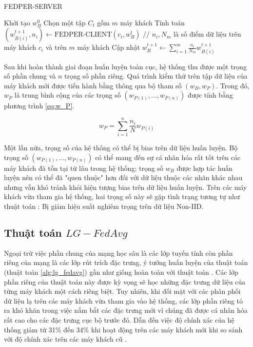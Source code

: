 \begin{algorithm}[H]
    \caption{FEDPER-SERVER \cite{arivazhagan2019federated}} \label{alg:fedper_server}
    \begin{algorithmic}[1]
        \State Khởi tạo $w_{B}^{0}$
            \State Chọn một tập $C_t$ gồm $m$ máy khách
                \State Tính toán $(w_{B(i)}^{t+1}, n_i) \gets \text{FEDPER-CLIENT}(c_i, w_B^t)$
            \EndFor
            \State // $n_i, N_m$ là số điểm dữ liệu trên máy khách $c_i$ và trên $m$ máy khách
            \State Cập nhật $w_B^{t+1} \gets \sum_{i=1}^m \frac{n_i}{N_m} w_{B(i)}^{t+1}$
        \EndFor
    \end{algorithmic}
\end{algorithm}

Sau khi hoàn thành giai đoạn huấn luyện toàn cục, hệ thống thu được một trọng số phần chung và $n$ trọng số phần riêng. Quá trình kiểm thử trên tập dữ liệu của máy khách mới được tiến hành bằng thông qua bộ tham số $(w_B, w_P)$. Trong đó, $w_P$ là trung bình cộng của các trọng số $(w_{P(1)},...,w_{P(n)})$ được tính bằng phương trình \ref{eq:w_P}.

\begin{dmath}
    \label{eq:w_P}
    w_P = \sum_{i=1}^n \frac{n_i}{N}w_{P(i)}
\end{dmath}

Một lần nữa, trọng số của hệ thống có thể bị bias trên dữ liệu huấn luyện. Bộ trọng số $(w_{P(1)},...,w_{P(n)})$ có thể mang đến sự cá nhân hóa rất tốt trên các máy khách đã tồn tại từ lâu trong hệ thống; trọng số $w_B$ được hợp tác huấn luyện nên có thể đã "quen thuộc" hơn đối với dữ liệu thuộc các nhãn khác nhau nhưng vẫn khó tránh khỏi hiện tượng bias trên dữ liệu huấn luyện. Trên các máy khách vừa tham gia hệ thống, hai trọng số này sẽ gặp tình trạng tương tự như thuật toán : Bị giảm hiệu suất nghiêm trọng trên dữ liệu Non-IID.

\subsection{Thuật toán $LG-FedAvg$}

Ngoại trừ việc phần chung của mạng học sâu là các lớp tuyến tính còn phần riêng của mạng là các lớp rút trích đặc trưng, ý tưởng huấn luyện của thuật toán  (thuật toán \ref{alg:lg_fedavg}) gần như giống hoàn toàn với thuật toán . Các lớp phần riêng của thuật toán này được kỳ vọng sẽ học những đặc trưng dữ liệu của từng máy khách một cách riêng biệt. Tuy nhiên, khi đối mặt với các phân phối dữ liệu lạ trên các máy khách vừa tham gia vào hệ thống, các lớp phần riêng tỏ ra khó khăn trong việc nắm bắt các đặc trưng mới vì chúng đã được cá nhân hóa rất cao cho các đặc trưng cục bộ trước đó. Dẫn đến việc độ chính xác của hệ thống giảm từ 31\% đến 34\% khi hoạt động trên các máy khách mới khi so sánh với độ chính xác trên các máy khách cũ \cite{liang2020think}.

